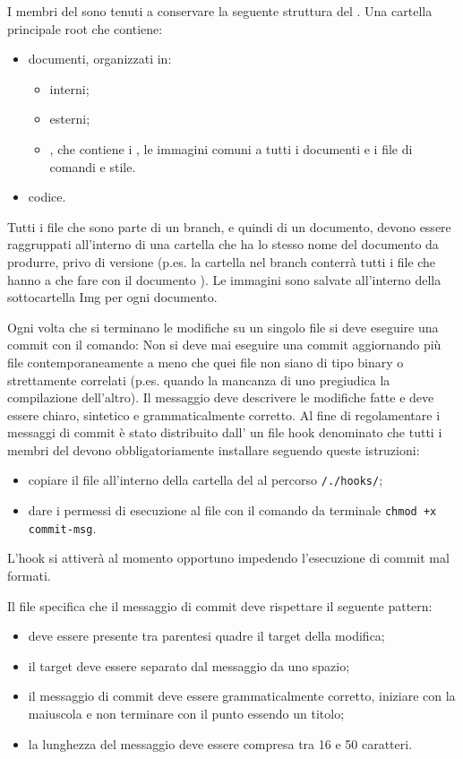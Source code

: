 \documentclass[a4paper, titlepage]{article}
\begin{document}
I membri del  sono tenuti a conservare la seguente struttura del .
Una cartella principale root che contiene:
\begin{itemize}
	\item documenti, organizzati in:
	\begin{itemize}
		\item interni;
		\item esterni;
		\item {}, che contiene i , le immagini comuni a tutti i documenti e i file di comandi e stile.
	\end{itemize}
	\item codice.
\end{itemize}
Tutti i file che sono parte di un branch, e quindi di un documento, devono essere raggruppati all'interno di una cartella che ha lo stesso nome del documento da produrre, privo di versione (p.es. la cartella  nel branch  conterrà tutti i file che hanno a che fare con il documento ). Le immagini sono salvate all'interno della sottocartella Img per ogni documento.

Ogni volta che si terminano le modifiche su un singolo file si deve eseguire una commit con il comando:
Non si deve mai eseguire una commit aggiornando più file contemporaneamente a meno che quei file non siano di tipo binary o strettamente correlati (p.es. quando la mancanza di uno pregiudica la compilazione dell'altro). Il messaggio deve descrivere le modifiche fatte e deve essere chiaro, sintetico e grammaticalmente corretto. Al fine di regolamentare i messaggi di commit è stato distribuito dall' un file hook denominato  che tutti i membri del  devono obbligatoriamente installare seguendo queste istruzioni:
\begin{itemize}
	\item copiare il file all'interno della cartella del  al percorso \texttt{/./hooks/};
	\item dare i permessi di esecuzione al file con il comando da terminale \texttt{chmod +x commit-msg}.
\end{itemize}
L'hook si attiverà al momento opportuno impedendo l'esecuzione di commit mal formati.

Il file  specifica che il messaggio di commit deve rispettare il seguente pattern:
\begin{itemize}
	\item deve essere presente tra parentesi quadre il target della modifica;
	\item il target deve essere separato dal messaggio da uno spazio;
	\item il messaggio di commit deve essere grammaticalmente corretto, iniziare con la maiuscola e non terminare con il punto essendo un titolo;
	\item la lunghezza del messaggio deve essere compresa tra 16 e 50 caratteri.
\end{itemize}
\end{document}
